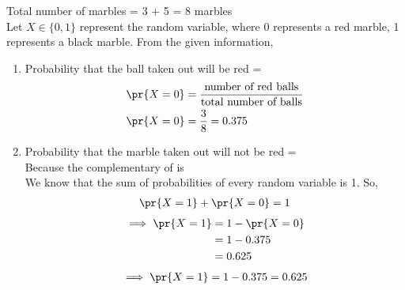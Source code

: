 Total number of marbles = 3 + 5 = 8 marbles\\
Let $X \in \{0,1\}$ represent the random variable, where 0 represents a red marble, 1 represents a black marble. From the given information, 

\begin{enumerate}
    
\item Probability that the ball taken out will be red = 
\begin{align}
    \pr{X=0} &= \frac{\text{number of red balls}}{\text{total number of balls}}\\
    \pr{X=0} &= \frac{3}{8} = 0.375
\end{align}
\item Probability that the marble taken out will not be red = \\
Because the complementary of  is \\
We know that the sum of probabilities of every random variable is 1. So,
\begin{align}
    \pr{X = 1}+\pr{X=0}=1
\end{align}
\begin{align}
    \implies \pr{X = 1} &= 1 -\pr{X=0} \\
    &= 1-0.375 \\
    &= 0.625
\end{align}
\begin{align}
    \implies \pr{X = 1} = 1 - 0.375 = 0.625
\end{align}
\end{enumerate}